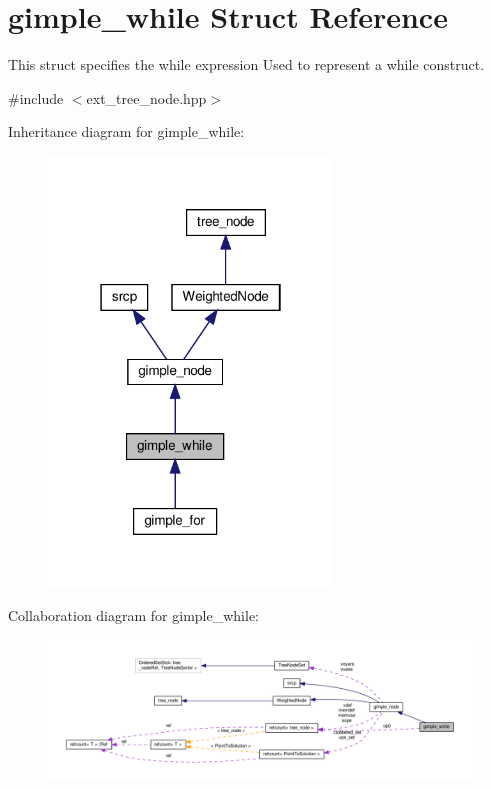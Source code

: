 \hypertarget{structgimple__while}{}\section{gimple\+\_\+while Struct Reference}
\label{structgimple__while}


This struct specifies the while expression Used to represent a while construct.  




{\ttfamily \#include $<$ext\+\_\+tree\+\_\+node.\+hpp$>$}



Inheritance diagram for gimple\+\_\+while\+:
\nopagebreak
\begin{figure}[H]
\begin{center}
\leavevmode
\includegraphics[width=214pt]{de/dd1/structgimple__while__inherit__graph}
\end{center}
\end{figure}


Collaboration diagram for gimple\+\_\+while\+:
\nopagebreak
\begin{figure}[H]
\begin{center}
\leavevmode
\includegraphics[width=350pt]{d1/d0b/structgimple__while__coll__graph}
\end{center}
\end{figure}
